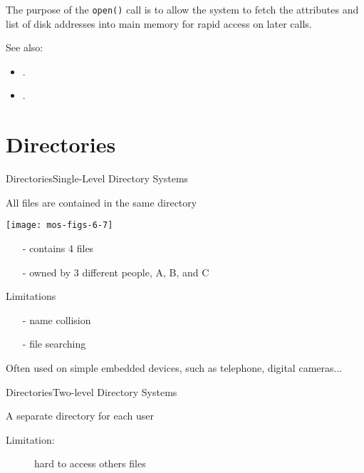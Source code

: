The purpose of the \verb|open()| call is to allow the system to fetch the attributes and
list of disk addresses into main memory for rapid access on later calls.
  
See also:
\begin{itemize}
\item {}.
\item {}.
\end{itemize}

\section{Directories}

\begin{frame}{Directories}{Single-Level Directory Systems}
  \begin{block}{All files are contained in the same directory}
    \begin{minipage}{.49\textwidth}
      \texttt{[image: mos-figs-6-7]}
    \end{minipage}\hfill
    \begin{minipage}{.49\textwidth}
      \begin{itemize}
      \item[-] contains 4 files
      \item[-] owned by 3 different people, A, B, and C
      \end{itemize}
    \end{minipage}
  \end{block}
  \begin{block}{Limitations}
    \begin{itemize}
    \item[-] name collision
    \item[-] file searching
    \end{itemize}
  \end{block}
  Often used on simple embedded devices, such as telephone, digital cameras...
\end{frame}

\begin{frame}{Directories}{Two-level Directory Systems}
  \begin{block}{A separate directory for each user}
    \begin{center}
       
    \end{center}
    \begin{description}
    \item[Limitation:] hard to access others files
    \end{description}
  \end{block}
\end{frame}


